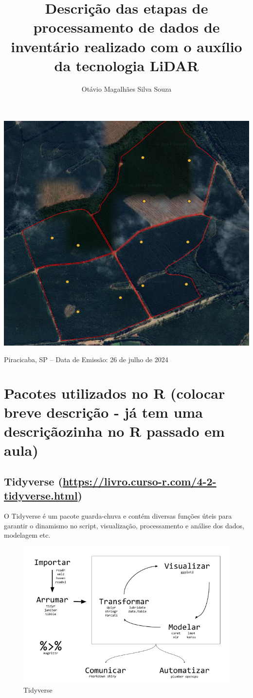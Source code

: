 \documentclass[
]{article}
\title{Descrição das etapas de processamento de dados de inventário
realizado com o auxílio da tecnologia LiDAR}
\author{Otávio Magalhães Silva Souza}
\date{}
\begin{document}
\maketitle

\begin{center}\includegraphics[width=0.4\linewidth]{IMAGES/CAPA} \end{center}

\centerline {Piracicaba, SP – Data de Emissão: 26 de julho de 2024}
\newpage

\tableofcontents

\newpage

\section{Pacotes utilizados no R (colocar breve descrição - já tem uma
descriçãozinha no R passado em
aula)}\label{pacotes-utilizados-no-r-colocar-breve-descriuxe7uxe3o---juxe1-tem-uma-descriuxe7uxe3ozinha-no-r-passado-em-aula}

\subsection{\texorpdfstring{Tidyverse
(\url{https://livro.curso-r.com/4-2-tidyverse.html})}{Tidyverse (https://livro.curso-r.com/4-2-tidyverse.html)}}\label{tidyverse-httpslivro.curso-r.com4-2-tidyverse.html}

O Tidyverse é um pacote guarda-chuva e contém diversas funções úteis
para garantir o dinamismo no script, visualização, processamento e
análise dos dados, modelagem etc.

\begin{figure}

{\centering \includegraphics[width=0.6\linewidth]{IMAGES/tidyverse} 

}

\caption{Tidyverse}\label{fig:unnamed-chunk-2}
\end{figure}
\end{document}
